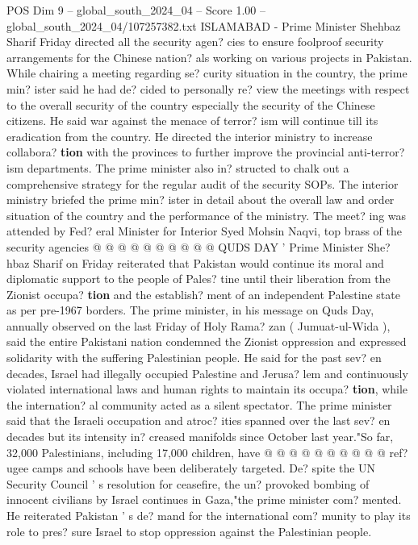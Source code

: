 \begin{textsample}{POS Dim 9 – global\_south\_2024\_04 – Score 1.00 – global\_south\_2024\_04/107257382.txt}  \label{ex:f9_pos_079}
ISLAMABAD - Prime Minister Shehbaz Sharif Friday directed all the security agen? cies to ensure foolproof security arrangements for the Chinese nation? als working on various projects in Pakistan.
While chairing a meeting regarding se? curity situation in the country, the prime min? ister said he had de? cided to personally re? view the meetings with respect to the overall security of the country especially the security of the Chinese citizens.
He said war against the menace of terror? ism will continue till its eradication from the country.
He directed the interior ministry to increase collabora? \textbf{tion} with the provinces to further improve the provincial anti-terror? ism departments.
The prime minister also in? structed to chalk out a comprehensive strategy for the regular audit of the security SOPs.
The interior ministry briefed the prime min? ister in detail about the overall law and order situation of the country and the performance of the ministry.
The meet? ing was attended by Fed? eral Minister for Interior Syed Mohsin Naqvi, top brass of the security agencies @ @ @ @ @ @ @ @ @ @ QUDS DAY ' Prime Minister She? hbaz Sharif on Friday reiterated that Pakistan would continue its moral and diplomatic support to the people of Pales? tine until their liberation from the Zionist occupa? \textbf{tion} and the establish? ment of an independent Palestine state as per pre-1967 borders.
The prime minister, in his message on Quds Day, annually observed on the last Friday of Holy Rama? zan ( Jumuat-ul-Wida ), said the entire Pakistani nation condemned the Zionist oppression and expressed solidarity with the suffering Palestinian people.
He said for the past sev? en decades, Israel had illegally occupied Palestine and Jerusa? lem and continuously violated international laws and human rights to maintain its occupa? \textbf{tion}, while the internation? al community acted as a silent spectator.
The prime minister said that the Israeli occupation and atroc? ities spanned over the last sev? en decades but its intensity in? creased manifolds since October last year."So far, 32,000 Palestinians, including 17,000 children, have @ @ @ @ @ @ @ @ @ @ ref? ugee camps and schools have been deliberately targeted.
De? spite the UN Security Council ' s resolution for ceasefire, the un? provoked bombing of innocent civilians by Israel continues in Gaza,"the prime minister com? mented.
He reiterated Pakistan ' s de? mand for the international com? munity to play its role to pres? sure Israel to stop oppression against the Palestinian people.

\end{textsample}
